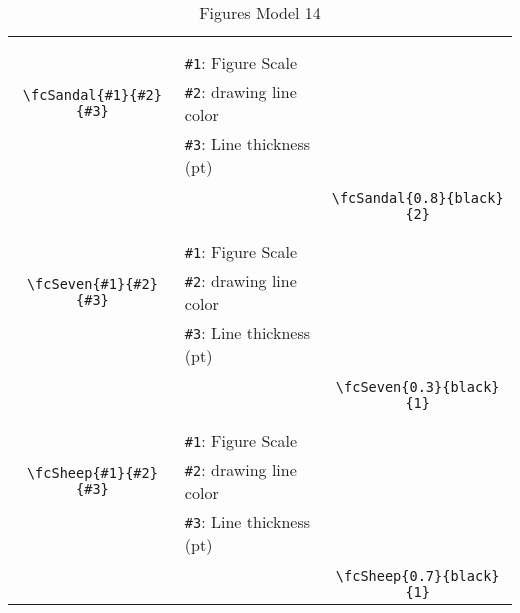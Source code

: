 \documentclass{article}
\begin{document}
\begin{table}[H]
\begin{tabular}{|c|l|c|}
	&&\multirow{5}{*}{\fcSandal{0.8}{black}{2}}\\	&&\\	&\verb|#1|: Figure Scale &\\	\verb|\fcSandal{#1}{#2}{#3}|&	\verb|#2|: drawing line color &\\	&\verb|#3|: Line thickness (pt) &\\ &&\\&&	\verb|\fcSandal{0.8}{black}{2}|\\\hline 	
	&&\multirow{5}{*}{\fcSeven{0.3}{black}{1}}\\	&&\\	&\verb|#1|: Figure Scale &\\	\verb|\fcSeven{#1}{#2}{#3}|&	\verb|#2|: drawing line color &\\	&\verb|#3|: Line thickness (pt) &\\ &&\\&&	\verb|\fcSeven{0.3}{black}{1}|\\\hline 	
	&&\multirow{5}{*}{\fcSheep{0.7}{black}{1}}\\	&&\\	&\verb|#1|: Figure Scale &\\	\verb|\fcSheep{#1}{#2}{#3}|&	\verb|#2|: drawing line color &\\	&\verb|#3|: Line thickness (pt) &\\ &&\\&&	\verb|\fcSheep{0.7}{black}{1}|\\\hline 	\hline\end{tabular}\caption{Figures Model 14}\label{tab14}\end{table}
\end{document}
